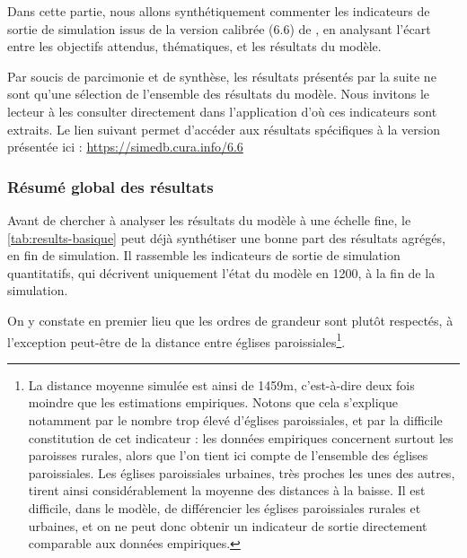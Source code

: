 Dans cette partie, nous allons synthétiquement commenter les indicateurs de sortie de simulation issus de la version calibrée (6.6) de \simfeodal{}, en analysant l'écart entre les objectifs attendus, thématiques, et les résultats du modèle.

\begin{mdframed}[backgroundcolor=black!5,footnoteinside=false]
Par soucis de parcimonie et de synthèse, les résultats présentés par la suite ne sont qu'une sélection de l'ensemble des résultats du modèle.
Nous invitons le lecteur à les consulter directement dans l'application \simedb{} d'où ces indicateurs sont extraits.
Le lien suivant permet d'accéder aux résultats spécifiques à la version présentée ici : \href{https://simedb.cura.info/6.6}{https://simedb.cura.info/6.6}
\end{mdframed}

\subsubsection{Résumé global des résultats \label{ssec:results-global}}

Avant de chercher à analyser les résultats du modèle à une échelle fine, le \cref{tab:results-basique} peut déjà synthétiser une bonne part des résultats agrégés, en fin de simulation.
Il rassemble les indicateurs de sortie de simulation quantitatifs, qui décrivent uniquement l'état du modèle en 1200, à la fin de la simulation.




On y constate en premier lieu que les ordres de grandeur sont plutôt respectés, à l'exception peut-être de la distance entre églises paroissiales\footnote{
	La distance moyenne simulée	est ainsi de 1459m, c'est-à-dire deux fois moindre que les estimations empiriques.
	Notons que cela s'explique notamment par le nombre trop élevé d'églises paroissiales, et par la difficile constitution de cet indicateur : les données empiriques concernent surtout les paroisses rurales, alors que l'on tient ici compte de l'ensemble des églises paroissiales.
	Les églises paroissiales urbaines, très proches les unes des autres, tirent ainsi considérablement la moyenne des distances à la baisse.
	Il est difficile, dans le modèle, de différencier les églises paroissiales rurales et urbaines, et on ne peut donc obtenir un indicateur de sortie directement comparable aux données empiriques.
}.

